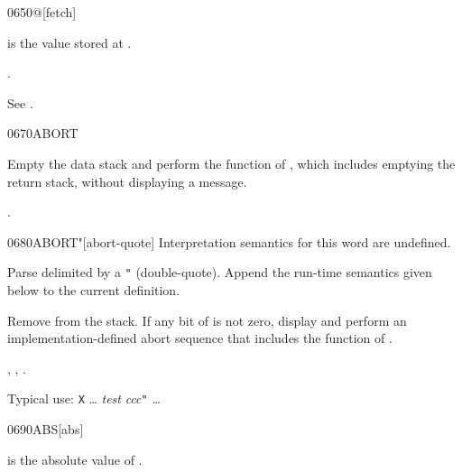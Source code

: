 \begin{worddef}{0650}{@}[fetch]
\item {}

	 is the value stored at .

\see {}.

	\begin{testing} %
		See .
	\end{testing}
\end{worddef}


\begin{worddef}{0670}{ABORT}
\item {}

	Empty the data stack and perform the function of ,
	which includes emptying the return stack, without displaying
	a message.

\see {}.
\end{worddef}


\begin{worddef}[ABORTq]{0680}{ABORT"}[abort-quote]
\interpret
	Interpretation semantics for this word are undefined.

\compile

	Parse  delimited by a \texttt{"} (double-quote).
	Append the run-time semantics given below to the current
	definition.

\runtime

	Remove  from the stack. If any bit of  is not
	zero, display  and perform an implementation-defined
	abort sequence that includes the function of .

\see {},
	,
	.

	\begin{rationale} %
		Typical use:
			\word{:} \texttt{X} {\ldots}
				\emph{test}  \emph{ccc}\texttt{"}
			{\ldots} \word{;}
	\end{rationale}
\end{worddef}


\begin{worddef}{0690}{ABS}[abs]
\item {}

	 is the absolute value of .

	\begin{testing} %
		 \\
		 \\
		 \\
	\end{testing}
\end{worddef}


